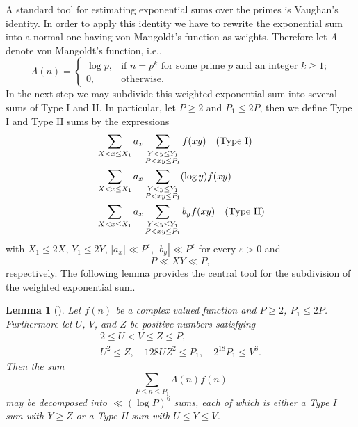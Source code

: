 \documentclass[a4paper,10pt]{amsart}
\newtheorem{lem}{Lemma}[section]
\numberwithin{equation}{section}
\theoremstyle{definition}
\theoremstyle{remark}
\renewcommand{\lvert}{\left\vert}
\renewcommand{\rvert}{\right\vert}
\begin{document}
A standard tool for estimating exponential sums over the primes is Vaughan's
identity. In order to apply this identity we have to rewrite the exponential
sum into a normal one having von Mangoldt's function as weights. Therefore let
$\Lambda$ denote von Mangoldt's function, i.e.,
\[
\Lambda(n)=\begin{cases}
\log p,&\text{if $n=p^k$ for some prime $p$ and an integer $k\geq1$;}\\
0,&\text{otherwise}.
\end{cases}
\]
In the next step %
we may subdivide this weighted exponential sum into several sums of Type I and
II. In particular, let $P\geq2$ and $P_1\leq 2P$, then we define Type
I and Type II sums by the expressions
\begin{align}
&\sum_{X<x\leq X_1}a_x\sum_{\substack{Y<y\leq Y_1\\P<xy\leq
    P_1}}f(xy)\label{type:1:sum}\quad(\text{Type I})\\
&\sum_{X<x\leq X_1}a_x\sum_{\substack{Y<y\leq Y_1\\P<xy\leq P_1}}(\log y)f(xy)\notag\\
&\sum_{X<x\leq X_1}a_x\sum_{\substack{Y<y\leq Y_1\\P<xy\leq P_1}}b_yf(xy)\label{type:2:sum}\quad(\text{Type II})
\end{align}
with $X_1\leq 2X$, $Y_1\leq 2Y$, $\lvert a_x\rvert\ll P^\varepsilon$, $\lvert
b_y\rvert\ll P^\varepsilon$ for every $\varepsilon>0$ and
\[
P\ll XY\ll P,
\]
respectively. The following lemma provides the central tool for the subdivision
of the weighted exponential sum.

\begin{lem}[{\cite[Lemma 1]{baker_kolesnik1985:distribution_p_alpha}}]
\label{bakkol:vaughan}
Let $f(n)$ be a complex valued function and $P\geq2$, $P_1\leq 2P$. Furthermore
let $U$, $V$, and $Z$ be positive numbers satisfying
\begin{gather}
2\leq U<V\leq Z\leq P,\\
U^2\leq Z,\quad 128UZ^2\leq P_1,\quad 2^{18}P_1\leq V^3.
\end{gather}
Then the sum
\[
\sum_{P\leq n\leq P_1}\Lambda(n)f(n)
\]
may be decomposed into $\ll(\log P)^6$ sums, each of which is either a Type I
sum with $Y\geq Z$ or a Type II sum with $U\leq Y\leq V$.
\end{lem}
\end{document}

